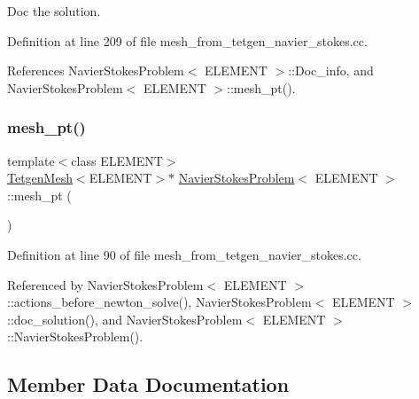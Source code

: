 Doc the solution. 



Definition at line 209 of file mesh\+\_\+from\+\_\+tetgen\+\_\+navier\+\_\+stokes.\+cc.



References Navier\+Stokes\+Problem$<$ E\+L\+E\+M\+E\+N\+T $>$\+::\+Doc\+\_\+info, and Navier\+Stokes\+Problem$<$ E\+L\+E\+M\+E\+N\+T $>$\+::mesh\+\_\+pt().

\mbox{\label{classNavierStokesProblem_a1d69e5e56711b1132e23b569679f04f6}} 
\subsubsection{\texorpdfstring{mesh\+\_\+pt()}{mesh\_pt()}}
{\footnotesize\ttfamily template$<$class E\+L\+E\+M\+E\+NT$>$ \\
\hyperlink{classoomph_1_1TetgenMesh}{Tetgen\+Mesh}$<$E\+L\+E\+M\+E\+NT$>$$\ast$ \hyperlink{classNavierStokesProblem}{Navier\+Stokes\+Problem}$<$ E\+L\+E\+M\+E\+NT $>$\+::mesh\+\_\+pt (\begin{DoxyParamCaption}{ }\end{DoxyParamCaption})\hspace{0.3cm}{\ttfamily [inline]}}



Definition at line 90 of file mesh\+\_\+from\+\_\+tetgen\+\_\+navier\+\_\+stokes.\+cc.



Referenced by Navier\+Stokes\+Problem$<$ E\+L\+E\+M\+E\+N\+T $>$\+::actions\+\_\+before\+\_\+newton\+\_\+solve(), Navier\+Stokes\+Problem$<$ E\+L\+E\+M\+E\+N\+T $>$\+::doc\+\_\+solution(), and Navier\+Stokes\+Problem$<$ E\+L\+E\+M\+E\+N\+T $>$\+::\+Navier\+Stokes\+Problem().



\subsection{Member Data Documentation}
\mbox{\label{classNavierStokesProblem_af77a241c0eb484c1669b538286d22e18}} 
